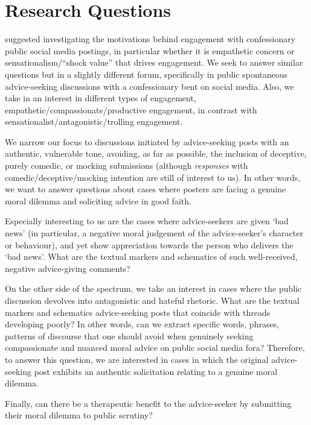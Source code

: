 \section{Research Questions}

\citet[56]{miller-2020} suggested investigating the motivations behind engagement with confessionary public social media postings, in particular whether it is empathetic concern or sensationalism/``shock value'' that drives engagement.
We seek to answer similar questions but in a slightly different forum,
specifically in public spontaneous
advice-seeking discussions with a confessionary bent
on social media. Also, we take in an interest in different types
of engagement, empathetic/compassionate/productive engagement,
in contrast with sensationalist/antagonistic/trolling engagement.

We narrow our focus to discussions initiated by advice-seeking posts with an authentic,
vulnerable tone, avoiding, as far as possible,
the inclusion of deceptive, purely comedic, or mocking submissions
(although {\em responses} with comedic/deceptive/mocking intention are still of interest to us).
In other words, we want to answer questions about cases where
posters are facing a genuine moral dilemma and soliciting advice
in good faith.

Especially interesting to us are the cases where advice-seekers
are given `bad news' (in particular, a negative moral judgement of the advice-seeker's character or behaviour), and yet show appreciation towards
the person who delivers the `bad news'.
What are the textual markers and schematics of such well-received,
negative advice-giving comments?

On the other side of the spectrum, we take an interest
in cases where the public discussion devolves into
antagonistic and hateful rhetoric.
What are the textual markers and schematics advice-seeking
posts that coincide with threads developing poorly?
In other words, can we extract specific words, phrases,
patterns of discourse that one should avoid when genuinely
seeking compassionate and nuanced moral advice
on public social media fora?
Therefore, to answer this question, we are interested
in cases in which the original advice-seeking post
exhibits an authentic solicitation relating to
a genuine moral dilemma.

Finally, can there be a therapeutic benefit to the advice-seeker
by submitting their moral dilemma to public scrutiny?
